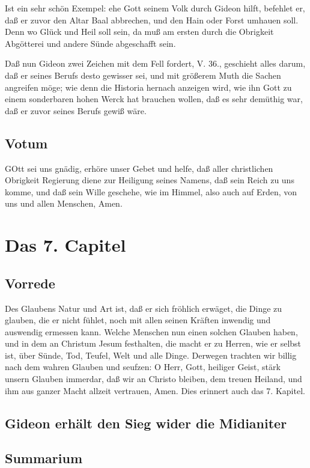 Ist ein sehr schön Exempel: ehe Gott seinem Volk durch Gideon hilft, befehlet er, daß er zuvor den Altar Baal abbrechen, und den Hain oder Forst umhauen soll. Denn wo Glück und Heil soll sein, da muß am ersten durch die Obrigkeit Abgötterei und andere Sünde abgeschafft sein.

Daß nun Gideon zwei Zeichen mit dem Fell fordert, V. 36., geschieht alles darum, daß er seines Berufs desto gewisser sei, und mit größerem Muth die Sachen angreifen möge; wie denn die Historia hernach anzeigen wird, wie ihn Gott zu einem sonderbaren hohen Werck hat brauchen wollen, daß es sehr demüthig war, daß er zuvor seines Berufs gewiß wäre.

\section{Votum}

GOtt sei uns gnädig, erhöre unser Gebet und helfe, daß aller christlichen Obrigkeit Regierung diene zur Heiligung seines Namens, daß sein Reich zu uns komme, und daß sein Wille geschehe, wie im Himmel, also auch auf Erden, von uns und allen Menschen, Amen.

\chapter{Das 7. Capitel}

\section{Vorrede}

Des Glaubens Natur und Art ist, daß er sich fröhlich erwäget, die Dinge zu glauben, die er nicht fühlet, noch mit allen seinen Kräften inwendig und auswendig ermessen kann. Welche
Menschen nun einen solchen Glauben haben, und in dem an Christum Jesum festhalten, die macht er zu Herren, wie er selbst ist, über Sünde, Tod, Teufel, Welt und alle Dinge. Derwegen trachten wir billig nach dem wahren Glauben und seufzen: O Herr, Gott, heiliger Geist, stärk unsern Glauben immerdar, daß wir an Christo bleiben, dem treuen Heiland, und ihm aus ganzer Macht allzeit vertrauen, Amen. Dies erinnert auch das 7. Kapitel.

\section{Gideon erhält den Sieg wider die Midianiter}

\section{Summarium}

